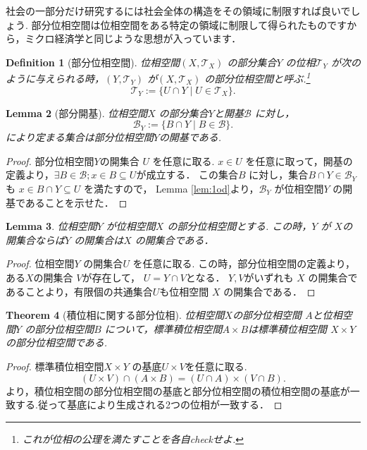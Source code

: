 \documentclass[dvipdfmx]{jbook}
\newtheorem{theorem}{Theorem}[section]
\newtheorem{lemma}[theorem]{Lemma}
\newtheorem{definition}[theorem]{Definition}
\theoremstyle{remark}
\theoremstyle{plain}
\begin{document}
社会の一部分だけ研究するには社会全体の構造をその領域に制限すれば良いでしょう. 部分位相空間は位相空間をある特定の領域に制限して得られたものですから，ミクロ経済学と同じような思想が入っています．

\begin{definition}[部分位相空間]
	位相空間$\left( X,\mathcal{T}_X \right) $ の部分集合$Y$ の位相$\mathcal{T}_Y$ が次のように与えられる時，$(Y,\mathcal{T}_Y)$ が$\left( X, \mathcal{T}_X \right) $ の部分位相空間と呼ぶ.\footnote{これが位相の公理を満たすことを各自checkせよ.}
	\[
	\mathcal{T}_Y := \{U \cap Y  \mid U \in \mathcal{T}_X\}
	.\] 

\end{definition}

\begin{lemma}[部分開基]
	位相空間$X$ の部分集合$Y$と開基$\mathcal{B}$ に対し，
	\[
	\mathcal{B}_Y := \{B\cap Y \mid B \in \mathcal{B}\} 
	.\]
	により定まる集合は部分位相空間$Y$の開基である.
\end{lemma}

\begin{proof}
	部分位相空間$Y$の開集合 $U$ を任意に取る.
	$x \in U$ を任意に取って，開基の定義より，$\exists B \in \mathcal{B}; x \in B \subseteq U$が成立する．
	この集合$B$ に対し，集合$B \cap Y \in \mathcal{B}_Y$も $x \in B \cap Y  \subseteq U$ を満たすので， Lemma \ref{lem:1od}より，$\mathcal{B}_Y$ が位相空間$Y$ の開基であることを示せた．
\end{proof}

\begin{lemma}
\label{lem:openset}
	位相空間$Y$ が位相空間$X$ の部分位相空間とする.
	この時，$Y$ が $X$の開集合ならば$Y$ の開集合は$X$ の開集合である．
\end{lemma}

\begin{proof}
	位相空間$Y$ の開集合$U$ を任意に取る.
	この時，部分位相空間の定義より，ある$X$の開集合 $V$が存在して， $U=Y\cap V$となる．
	$Y,V$がいずれも $X$ の開集合であることより，有限個の共通集合$U$も位相空間 $X$ の開集合である．
\end{proof}

\begin{theorem}[積位相に関する部分位相]
	位相空間$X$の部分位相空間 $A$と位相空間$Y$ の部分位相空間$B$ について，標準積位相空間$A\times B$は標準積位相空間 $X \times Y$の部分位相空間である.
\end{theorem}

\begin{proof}
	標準積位相空間$X \times Y$ の基底$U\times V$を任意に取る.
	 \[
		 \left(U \times V\right) \cap \left( A \times B \right) = \left( U \cap A  \right) \times \left( V \cap B \right) 
	.\]
	より，積位相空間の部分位相空間の基底と部分位相空間の積位相空間の基底が一致する.従って基底により生成される2つの位相が一致する．
\end{proof}
\end{document}
